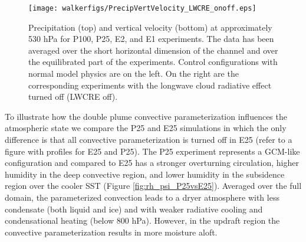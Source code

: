 \documentclass[11pt]{article}   	%
\begin{document}
\begin{figure}
  \centering
      \texttt{[image: walkerfigs/PrecipVertVelocity\_LWCRE\_onoff.eps]}
  \caption{Precipitation (top) and vertical velocity (bottom) at approximately 530 hPa for P100, P25, E2, and E1 experiments.  
  The data has been averaged over the short horizontal dimension of the channel and over the 
  equilibrated part of the experiments.  Control configurations with normal model physics are on the 
  left.  On the right are the corresponding experiments with the longwave cloud radiative effect turned
  off (LWCRE off).}
  \label{fig:precip_vertvel}
\end{figure}
%
%
%


To illustrate how the double plume convective parameterization influences the atmospheric state we compare the P25 and
E25 simulations in which the only difference is that all convective parameterization is turned off in E25 (refer to a figure with
profiles for E25 and P25).  The P25 experiment represents a GCM-like configuration and compared to E25 has a stronger 
overturning circulation, higher humidity in the deep convective region, and lower humidity in the subsidence region over the 
cooler SST (Figure \ref{fig:rh_psi_P25vsE25}).  Averaged over the full domain, the parameterized convection leads to a 
dryer atmosphere with less 
condensate (both liquid and ice) and with weaker radiative cooling and condensational heating (below 800 hPa).  However, in 
the updraft region the convective parameterization results in more moisture aloft.      
\end{document}
